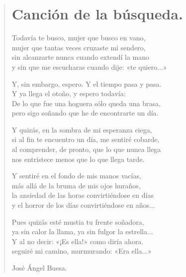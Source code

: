 \documentclass[11pt, portrait, twoside, notitlepage, openright]{book}
\begin{document}
\newpage
\begin{verse}
\begin{center}
\section{Canción de la búsqueda.}
\end{center}
Todavía te busco, mujer que busco en vano,\\
mujer que tantas veces cruzaste mi sendero,\\
sin alcanzarte nunca cuando extendí la mano\\
y sin que me escucharas cuando dije: «te quiero...»
\newline

Y, sin embargo, espero. Y el tiempo pasa y pasa.\\
Y ya llega el otoño, y espero todavía:\\
De lo que fue una hoguera sólo queda una brasa,\\
pero sigo soñando que he de encontrarte un día.
\newline

Y quizás, en la sombra de mi esperanza ciega,\\
si al fin te encuentro un día, me sentiré cobarde,\\
al comprender, de pronto, que lo que nunca llega\\
nos entristece menos que lo que llega tarde.
\newline

Y sentiré en el fondo de mis manos vacías,\\
más allá de la bruma de mis ojos huraños,\\
la ansiedad de las horas convirtiéndose en días\\
y el horror de los días convirtiéndose en años...
\newpage

Pues quizás esté mustia tu frente soñadora,\\
ya sin calor la llama, ya sin fulgor la estrella...\\
Y al no decir: «¡Es ella!» como diría ahora.\\
seguiré mi camino, murmurando: «Era ella...»
\newline

José Ángel Buesa.
\end{verse}
\end{document}
